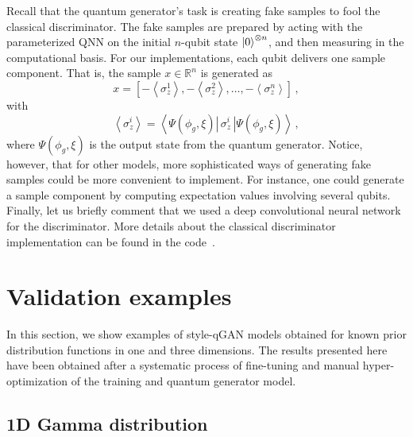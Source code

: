 \documentclass[twocolumn,preprintnumbers,superscriptaddress]{revtex4-2}
\begin{document}
Recall that the quantum generator's task is creating fake samples to fool the classical discriminator. The fake samples are prepared by acting with the parameterized QNN on the initial $n$-qubit state $\ket{0}^{\otimes n}$, and then measuring in the computational basis. For our implementations, each qubit delivers one sample component. That is, the sample $x \in \mathbb{R}^n$ is generated as
\begin{equation}
    \label{eq:samples} x = \left[-\left\langle\sigma_z^1\right\rangle,-\left\langle\sigma_z^2\right\rangle,\hdots,-\left\langle\sigma_z^n\right\rangle\right]\,,
\end{equation}
with
\begin{equation}
    \label{eq:expectation}\left\langle\sigma_z^i\right\rangle = \left\langle\Psi(\phi_g,\xi)\left|\,\sigma_z^i\,\right|\Psi(\phi_g,\xi)\right\rangle \,,
\end{equation}
where $\Psi(\phi_g,\xi)$ is the output state from the quantum generator. Notice, however, that for other models, more sophisticated ways of generating fake samples could be more convenient to implement. For instance, one could generate a sample component by computing expectation values involving several qubits. Finally, let us briefly comment that we used a deep convolutional neural network for the discriminator. More details about the classical discriminator implementation can be found in the code~\cite{qGAN_github_code}.

\section{Validation examples}
\label{sec:validation}

In this section, we show examples of style-qGAN models obtained for known prior
distribution functions in one and three dimensions. The results presented here
have been obtained after a systematic process of fine-tuning and manual
hyper-optimization of the training and quantum generator model.

\subsection{1D Gamma distribution}
\label{sec:gamma}
\end{document}
